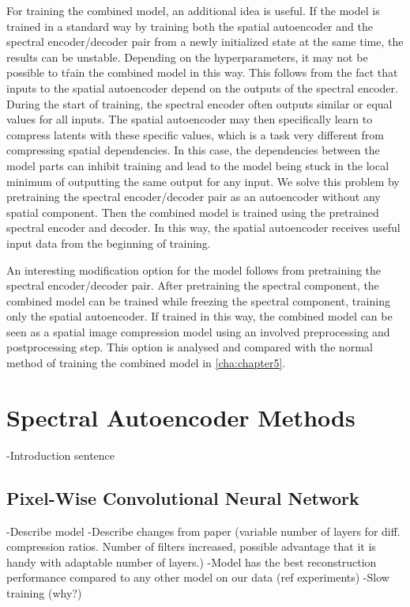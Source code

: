 For training the combined model, an additional idea is useful. If the model is trained in a standard way by training both the spatial autoencoder and the spectral encoder/decoder pair from a newly initialized state at the same time, the results can be unstable. Depending on the hyperparameters, it may not be possible to tŕain the combined model in this way. This follows from the fact that inputs to the spatial autoencoder depend on the outputs of the spectral encoder. During the start of training, the spectral encoder often outputs similar or equal values for all inputs. The spatial autoencoder may then specifically learn to compress latents with these specific values, which is a task very different from compressing spatial dependencies. In this case, the dependencies between the model parts can inhibit training and lead to the model being stuck in the local minimum of outputting the same output for any input. We solve this problem by pretraining the spectral encoder/decoder pair as an autoencoder without any spatial component. Then the combined model is trained using the pretrained spectral encoder and decoder. In this way, the spatial autoencoder receives useful input data from the beginning of training. 

An interesting modification option for the model follows from pretraining the spectral encoder/decoder pair. After pretraining the spectral component, the combined model can be trained while freezing the spectral component, training only the spatial autoencoder. If trained in this way, the combined model can be seen as a spatial image compression model using an involved preprocessing and postprocessing step. This option is analysed and compared with the normal method of training the combined model in \autoref{cha:chapter5}.
\section{Spectral Autoencoder Methods}
-Introduction sentence
\subsection{Pixel-Wise Convolutional Neural Network\label{sec:conv1d}}
-Describe model
-Describe changes from paper (variable number of layers for diff. compression ratios. Number of filters increased, possible advantage that it is handy with adaptable number of layers.)
-Model has the best reconstruction performance compared to any other model on our data (ref experiments)
-Slow training (why?)

